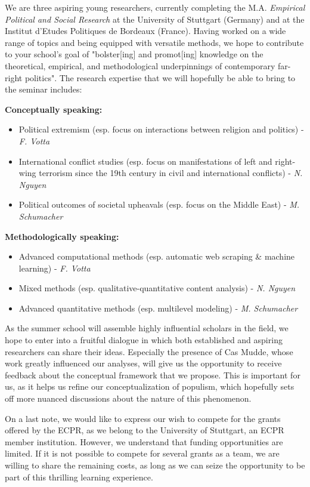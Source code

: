 \documentclass[10pt]{article}
\begin{document}
We are three aspiring young researchers, currently completing the M.A. \textit{Empirical Political and Social Research} at the University of Stuttgart (Germany) and at the Institut d'Etudes Politiques de Bordeaux (France). Having worked on a wide range of topics and being equipped with versatile methods, we hope to contribute to your school's goal of "bolster[ing] and promot[ing] knowledge on the theoretical, empirical, and methodological underpinnings of contemporary far-right politics". The research expertise that we will hopefully be able to bring to the seminar includes:

\vspace{0.15cm}

\textbf{Conceptually speaking:}
\begin{itemize}
\item Political extremism (esp. focus on interactions between religion and politics) - \textit{F. Votta}
\item International conflict studies (esp. focus on manifestations of left and right-wing terrorism since the 19th century in civil and international conflicts) - \textit{N. Nguyen}
\item Political outcomes of societal upheavals (esp. focus on the Middle East) - \textit{M. Schumacher}
\end{itemize}

\textbf{Methodologically speaking:}
\begin{itemize}
\item Advanced computational methods (esp. automatic web scraping \& machine learning) - \textit{F. Votta}
\item Mixed methods (esp. qualitative-quantitative content analysis) - \textit{N. Nguyen}
\item Advanced quantitative methods (esp. multilevel modeling) - \textit{M. Schumacher}
\end{itemize}

As the summer school will assemble highly influential scholars in the field, we hope to enter into a fruitful dialogue in which both established and aspiring researchers can share their ideas. Especially the presence of Cas Mudde, whose work greatly influenced our analyses, will give us the opportunity to receive feedback about the conceptual framework that we propose. This is important for us, as it helps us refine our conceptualization of populism, which hopefully sets off more nuanced discussions about the nature of this phenomenon.

On a last note, we would like to express our wish to compete for the grants offered by the ECPR, as we belong to the University of Stuttgart, an ECPR member institution. However, we understand that funding opportunities are limited. If it is not possible to compete for several grants as a team, we are willing to share the remaining costs, as long as we can seize the opportunity to be part of this thrilling learning experience. 
\end{document}
